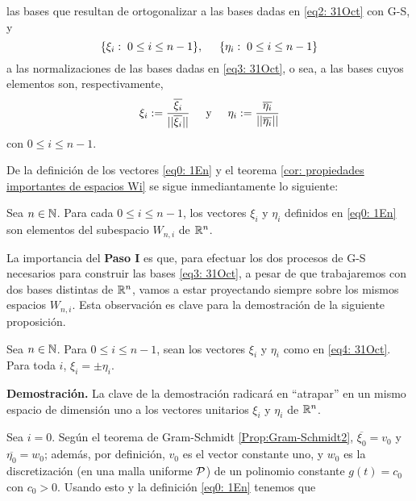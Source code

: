 \begin{itemize}
las bases que resultan de ortogonalizar a 
las bases dadas en \eqref{eq2: 31Oct} con G-S, y 
\begin{equation}
\label{eq4: 31Oct}
\{\xi_{i}: \hspace{0.1cm} 0 \leq i \leq n-1  \}, \hspace{0.5cm}
\{\eta_{i}: \hspace{0.1cm} 0 \leq i \leq n-1 \}
\end{equation}
a las normalizaciones de las bases dadas en 
\eqref{eq3: 31Oct}, o sea, a las bases cuyos elementos son,
respectivamente,
\begin{equation}
\label{eq0: 1En}
\xi_{i}:= \frac{\overline{\xi_{i}}}{||\overline{\xi_{i}}||}
\hspace{0.5cm} \text{y} \hspace{0.5cm}
\eta_{i}:= \frac{\overline{\eta_{i}}}{||\overline{\eta_{i}}||}
\end{equation}
con $0 \leq i \leq n-1$.

De la definición de los vectores \eqref{eq0: 1En}
y el teorema \eqref{cor: propiedades importantes de espacios Wi} se
sigue inmediantamente lo siguiente:

\begin{obs}
\label{obs: los xi y los etai son elementos de Wni}
Sea $n \in \mathbb{N}$. Para cada $0 \leq i \leq n-1$, los vectores
$\xi_{i}$ y $\eta_{i}$ 
definidos en \eqref{eq0: 1En} son elementos del
subespacio $W_{n, i}$ de $\mathbb{R}^{n}$.
\end{obs}

La importancia del \textbf{Paso I} es que, 
para efectuar los dos
procesos de G-S necesarios para
construir las bases 
\eqref{eq3: 31Oct}, a pesar de que trabajaremos
con dos bases distintas de $\mathbb{R}^{n}$,
vamos a estar proyectando siempre sobre 
los mismos espacios $W_{n,i}$.
Esta observación es clave para la 
demostración de la siguiente proposición.


\begin{prop} \label{prop:signo}
Sea $n \in \mathbb{N}$.
Para $0 \leq i \leq n-1$, sean los vectores $\xi_{i}$
y $\eta_{i}$ como en \eqref{eq4: 31Oct}.
Para toda $i$, $\xi_{i}= \pm \eta_{i}$.
\end{prop}
\noindent
\textbf{Demostración.}
La clave de la demostración
radicará en ``atrapar'' en un mismo espacio de 
dimensión uno a los vectores
unitarios $\xi_{i}$ y $\eta_{i}$ de $\mathbb{R}^{n}$. 


Sea $i=0$. Según el teorema de Gram-Schmidt
\ref{Prop:Gram-Schmidt2}, $\overline{\xi_{0}}=v_{0}$
y $\overline{\eta_{0}}=w_{0}$; además,
por definición, $v_{0}$ es
el vector constante uno, y
$w_{0}$ es la discretización (en una malla uniforme $\mathcal{P}$)
de un polinomio constante $g(t)=c_{0}$ con $c_{0}>0$.
Usando esto y la definición \eqref{eq0: 1En}
tenemos que


\end{itemize}
